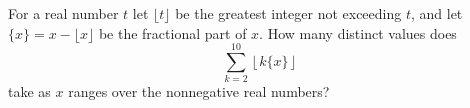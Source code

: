 For a real number $t$ let $\lfloor t\rfloor$ be the greatest integer not exceeding $t$, and let $\{x\}=x-\lfloor x\rfloor$ be the fractional part of $x$. How many distinct values does
\[\sum_{k=2}^{10}\left\lfloor k\{x\}\right\rfloor\]
take as $x$ ranges over the nonnegative real numbers?
